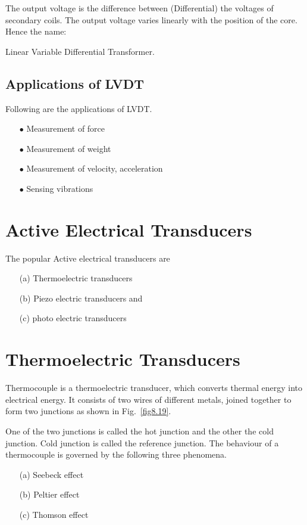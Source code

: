 The output voltage is the difference between (Differential) the voltages of secondary coils. The output voltage varies linearly with the position of the core. Hence the name:

Linear Variable Differential Transformer.

\subsection{Applications of LVDT}\label{sec8.11.1}

Following are the applications of LVDT.
\begin{itemize}
\item[$\bullet$] Measurement of force

\item[$\bullet$] Measurement of weight

\item[$\bullet$] Measurement of velocity, acceleration

\item[$\bullet$] Sensing vibrations
\end{itemize}

\section{Active Electrical Transducers}\label{sec8.12}

The popular Active electrical transducers are
\begin{itemize}
\item[(a)] Thermoelectric transducers

\item[(b)] Piezo electric transducers and

\item[(c)] photo electric transducers
\end{itemize}

\section{Thermoelectric Transducers}\label{sec8.13}

Thermocouple is a thermoelectric transducer, which converts thermal energy into electrical energy. It consists of two wires of different metals, joined together to form two junctions as shown in Fig.~\ref{fig8.19}.

One of the two junctions is called the hot junction and the other the cold junction. Cold junction is called the reference junction. The behaviour of a thermocouple is governed by the following three phenomena.
\begin{itemize}
\item[(a)] Seebeck effect

\item[(b)] Peltier effect

\item[(c)] Thomson effect
\end{itemize}

